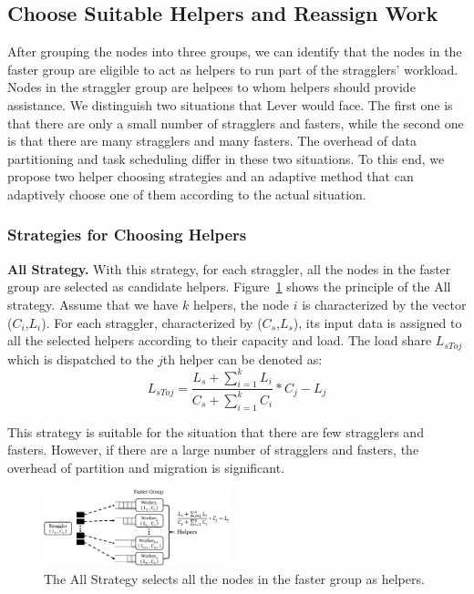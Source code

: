 \subsection{Choose Suitable Helpers and Reassign Work}

After grouping the nodes into three groups, we can identify that the nodes in
the faster group are eligible to act as helpers to run part of the stragglers' workload.
Nodes in the straggler group are helpees to whom helpers should provide
assistance. We distinguish two situations that Lever would face. The first one
is that there are only a small number of stragglers and fasters, while the
second one is that there are many stragglers and many fasters. The overhead of
data partitioning and task scheduling differ in these two situations. To this
end, we propose two helper choosing strategies and an adaptive method that can
adaptively choose one of them according to the actual situation.

\subsubsection{Strategies for Choosing Helpers}

\textbf{All Strategy.} With this strategy, for each straggler, all the nodes in
the faster group are selected as candidate helpers. 
Figure~\ref{Fig. 8:} shows the
principle of the All strategy. Assume that we have $k$ helpers, the node $i$ is
characterized by the vector (\emph{$C_i$},\emph{$L_i$}). For each straggler,
characterized by (\emph{$C_s$},\emph{$L_s$}), its input data is
assigned to all the selected helpers according to their capacity and load.
The load share \emph{{$L_{sToj}$}} which is dispatched to the $j$th helper can be
denoted as:
  \begin{equation}
  L_{sToj} = \frac{L_s + \sum_{i=1}^k L_i}{C_s + \sum_{i=1}^k C_i}*C_j - L_j
  \end{equation}

This strategy is suitable for the situation that there are few stragglers and
fasters. However, if there are a large number of stragglers and fasters, the
overhead of partition and migration is significant.
  \begin{figure}[htbp]
    \centering
    \includegraphics[width=0.48\textwidth]{FigureS1}
    \caption{The All Strategy selects all the nodes in the faster group as helpers.}
    \label{Fig. 8:}
  \end{figure}

